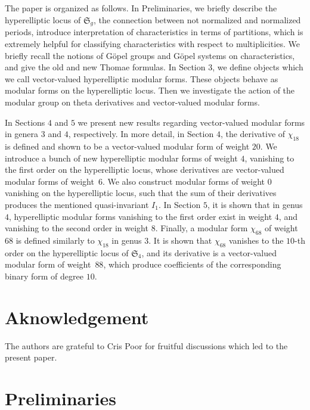 \documentclass[twoside]{amsart}
\theoremstyle{definition}
\theoremstyle{plain}
\begin{document}
The paper is organized as follows. In Preliminaries, we briefly describe 
the hyperelliptic locus of $\mathfrak{S}_g$, the connection between not normalized and normalized
periods, introduce interpretation of characteristics in terms of partitions, which is extremely helpful
for classifying characteristics with respect to multiplicities. 
We briefly recall the notions of
G\"{o}pel groups and G\"{o}pel systems on characteristics, and give the old and new Thomae formulas.
In Section $3$, we define objects which we call  vector-valued hyperelliptic modular forms. 
These objects behave as modular forms on the hyperelliptic locus.
Then we investigate the action of the modular group on theta derivatives
and vector-valued modular forms. 

In Sections $4$ and $5$ we present new results regarding 
vector-valued modular forms in genera $3$ and $4$, respectively. 
In more detail, in Section $4$, the derivative of $\chi_{18}$ is defined and shown to be 
a vector-valued modular  form 
of weight $20$. We introduce a bunch of new hyperelliptic modular forms of weight $4$,
vanishing to the first order on the hyperelliptic locus, whose derivatives are 
vector-valued modular forms of weight~$6$.
We also construct modular forms of weight $0$ vanishing on the hyperelliptic locus,
such that the sum of their derivatives produces the mentioned quasi-invariant $I_1$.
In Section $5$, it is shown that in genus $4$, hyperelliptic modular forms vanishing to the first order
exist in weight $4$, and vanishing to the second order in weight $8$.
Finally, a modular form $\chi_{68}$ of weight $68$ is defined similarly to $\chi_{18}$ in genus $3$.
It is shown that $\chi_{68}$ vanishes to the $10$-th order on the hyperelliptic locus of $\mathfrak{S}_4$, 
and its derivative is a vector-valued modular form of  weight~$88$, 
which produce coefficients of the corresponding  binary form of degree $10$.


\section*{Aknowledgement}
The authors are grateful to Cris Poor  for fruitful discussions which led to the present paper.



\section{Preliminaries}
\end{document}
